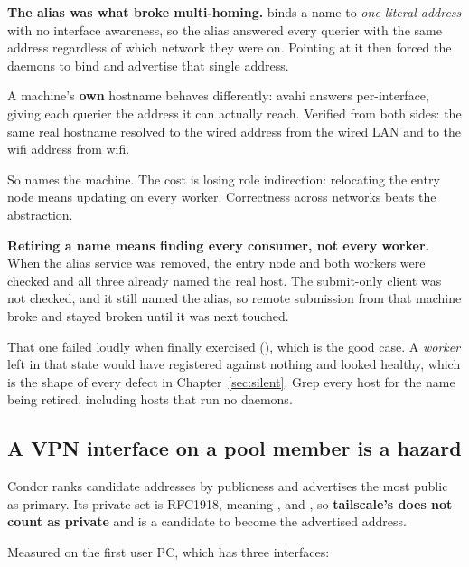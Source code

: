 \begin{trap}
\textbf{The alias was what broke multi-homing.}  binds a
name to \emph{one literal address} with no interface awareness, so the alias
answered every querier with the same address regardless of which network they
were on. Pointing  at it then forced the daemons to bind
and advertise that single address.
\end{trap}

A machine's \textbf{own} hostname behaves differently: avahi answers
per-interface, giving each querier the address it can actually reach. Verified
from both sides: the same real hostname resolved to the wired address from the
wired LAN and to the wifi address from wifi.

So  names the machine. The cost is losing role indirection:
relocating the entry node means updating  on every worker.
Correctness across networks beats the abstraction.

\begin{trap}
\textbf{Retiring a name means finding every consumer, not every worker.} When
the alias service was removed, the entry node and both workers were checked and
all three already named the real host. The submit-only client was not checked,
and it still named the alias, so remote submission from that machine broke and
stayed broken until it was next touched.
\end{trap}

That one failed loudly when finally exercised (), which
is the good case. A \emph{worker} left in that state would have registered
against nothing and looked healthy, which is the shape of every defect in
Chapter~\ref{sec:silent}. Grep every host for the name being retired, including
hosts that run no daemons.

\subsection{A VPN interface on a pool member is a hazard}
\label{sec:vpn}

Condor ranks candidate addresses by publicness and advertises the most public as
primary. Its private set is RFC1918, meaning ,  and
, so \textbf{tailscale's  does not count as
private} and is a candidate to become the advertised address.

Measured on the first user PC, which has three interfaces:

